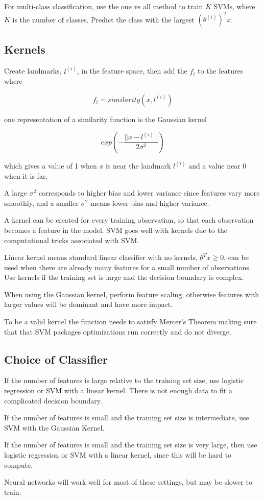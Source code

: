 \documentclass[
]{article}
\begin{document}
For multi-class classification, use the one vs all method to train \(K\)
SVMs, where \(K\) is the number of classes. Predict the class with the
largest \((\theta^{(i)})^Tx\).

\hypertarget{header-n13}{%
\subsection{Kernels}\label{header-n13}}

Create landmarks, \(l^{(i)}\), in the feature space, then add the
\(f_i\) to the features where

\[f_i = similarity(x, l^{(i)})\]

one representation of a similarity function is the Gaussian kernel

\[exp(-\frac{||x-l^{(i)}||}{2\sigma^2})\]

which gives a value of 1 when \(x\) is near the landmark \(l^{(i)}\) and
a value near \(0\) when it is far.

A large \(\sigma^2\) corresponds to higher bias and lower variance since
features vary more smoothly, and a smaller \(\sigma^2\) means lower bias
and higher variance.

A kernel can be created for every training observation, so that each
observation becomes a feature in the model. SVM goes well with kernels
due to the computational tricks associated with SVM.

Linear kernel means standard linear classifier with no kernels,
\(\theta^Tx \ge 0\), can be used when there are already many features
for a small number of observations. Use kernels if the training set is
large and the decision boundary is complex.

When using the Gaussian kernel, perform feature scaling, otherwise
features with larger values will be dominant and have more impact.

To be a valid kernel the function needs to satisfy Mercer's Theorem
making sure that that SVM packages optimizations run correctly and do
not diverge.

\hypertarget{header-n24}{%
\subsection{Choice of Classifier}\label{header-n24}}

If the number of features is large relative to the training set size,
use logistic regression or SVM with a linear kernel. There is not enough
data to fit a complicated decision boundary.

If the number of features is small and the training set size is
intermediate, use SVM with the Gaussian Kernel.

If the number of features is small and the training set size is very
large, then use logistic regression or SVM with a linear kernel, since
this will be hard to compute.

Neural networks will work well for most of these settings, but may be
slower to train.
\end{document}
